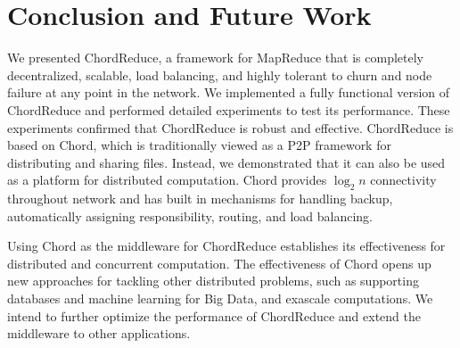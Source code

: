 \documentclass[10pt, conference, compsocconf]{IEEEtran}
\begin{document}
\section{Conclusion and Future Work}
We presented ChordReduce, a framework for MapReduce that is completely decentralized, scalable, load balancing, and highly tolerant to churn and node failure at any point in the network. We implemented a fully functional version of ChordReduce and performed detailed experiments to test its performance. These experiments confirmed that ChordReduce is robust and effective. ChordReduce is based on Chord, which is traditionally viewed as a P2P framework for distributing and sharing files.  Instead, we demonstrated that it can also be used as a platform for distributed computation.  Chord provides $\log_{2} n$ connectivity throughout network and has built in mechanisms for handling backup, automatically assigning responsibility, routing, and load balancing. 



Using Chord as the middleware for ChordReduce establishes its effectiveness for distributed and concurrent computation.
The effectiveness of Chord opens up new approaches for tackling other distributed problems, such as supporting databases and machine learning for Big Data, and exascale computations. We intend to further optimize the performance of ChordReduce and extend the middleware to other applications.






\end{document}
